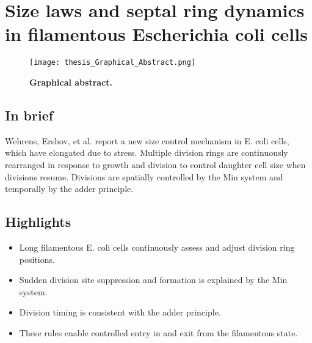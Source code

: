 

\chapter{Size laws and septal ring dynamics in filamentous Escherichia coli cells}
\label{chapter:filarecovery}



\begin{figure}[t]
    \centering
    \texttt{[image: thesis\_Graphical\_Abstract.png]} %
    \caption*{ 
        \centering        
        \textbf{Graphical abstract.}
    }
    \label{fig:filarecovery:graphicalabstract}
\end{figure}

\section*{In brief}
Wehrens, Ershov, et al. report a new size control mechanism in E. coli cells, which have elongated due to stress. Multiple division rings are continuously rearranged in response to growth and division to control daughter cell size when divisions resume. Divisions are spatially controlled by the Min system and temporally by the adder principle.

\section*{Highlights}
\begin{itemize}[itemsep=1pt,parsep=1pt]
    \item Long filamentous E. coli cells continuously assess and adjust division ring positions.
    \item Sudden division site suppression and formation is explained by the Min system.
    \item Division timing is consistent with the adder principle.
    \item These rules enable controlled entry in and exit from the filamentous state.
\end{itemize}

\clearpage

